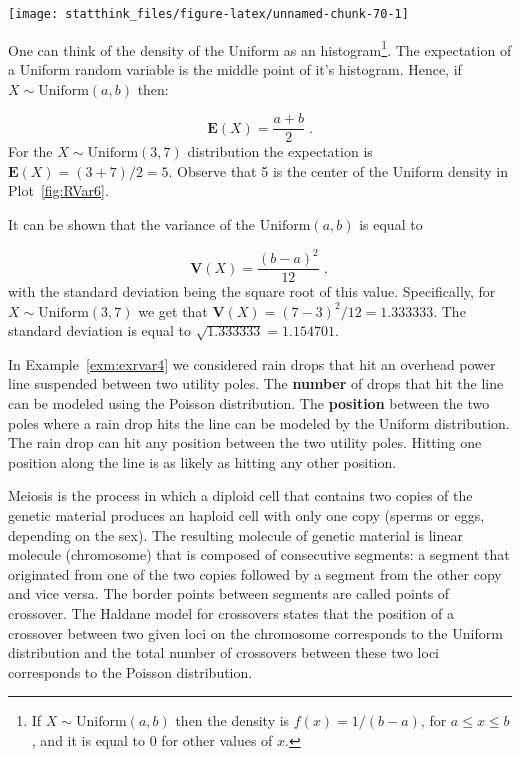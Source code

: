 \documentclass[
]{krantz}
\newcommand{\Expec}{\mathbf{E}}
\newcommand{\Var}{\mathbf{V}}
\theoremstyle{definition}
\theoremstyle{definition}
\theoremstyle{definition}
\theoremstyle{remark}
\let\BeginKnitrBlock\begin \let\EndKnitrBlock\end
\begin{document}
\begin{center}\texttt{[image: statthink\_files/figure-latex/unnamed-chunk-70-1]} \end{center}

One can think of the density of the Uniform as an histogram\footnote{If \(X \sim \mathrm{Uniform}(a,b)\) then the density is
  \(f(x) = 1/(b-a)\), for \(a \leq x \leq b\), and it is equal to 0 for
  other values of \(x\).}. The
expectation of a Uniform random variable is the middle point of it's
histogram. Hence, if \(X \sim \mathrm{Uniform}(a,b)\) then:

\[\Expec(X) = \frac{a+b}{2}\;.\] For the \(X \sim \mathrm{Uniform}(3,7)\)
distribution the expectation is \(\Expec(X)= (3+7)/2 = 5\). Observe that 5
is the center of the Uniform density in Plot~\ref{fig:RVar6}.

It can be shown that the variance of the \(\mathrm{Uniform}(a,b)\) is
equal to

\[\Var(X) = \frac{(b-a)^2}{12}\;,\] with the standard deviation
being the square root of this value. Specifically, for
\(X \sim \mathrm{Uniform}(3,7)\) we get that
\(\Var(X) = (7-3)^2/12 = 1.333333\). The standard deviation is equal to
\(\sqrt{1.333333} = 1.154701\).

\BeginKnitrBlock{example}
\protect\hypertarget{exm:exrvar5}{}{\label{exm:exrvar5} }In Example~\ref{exm:exrvar4} we considered
rain drops that hit an overhead power line suspended between two utility
poles. The {\textbf{number}} of drops that hit the line can be modeled
using the Poisson distribution. The {\textbf{position}} between the two
poles where a rain drop hits the line can be modeled by the Uniform
distribution. The rain drop can hit any position between the two utility
poles. Hitting one position along the line is as likely as hitting any
other position.
\EndKnitrBlock{example}

\BeginKnitrBlock{example}
\protect\hypertarget{exm:exrvar6}{}{\label{exm:exrvar6} }Meiosis is the process in which a diploid cell
that contains two copies of the genetic material produces an haploid
cell with only one copy (sperms or eggs, depending on the sex). The
resulting molecule of genetic material is linear molecule (chromosome)
that is composed of consecutive segments: a segment that originated from
one of the two copies followed by a segment from the other copy and vice
versa. The border points between segments are called points of
crossover. The Haldane model for crossovers states that the position of
a crossover between two given loci on the chromosome corresponds to the
Uniform distribution and the total number of crossovers between these
two loci corresponds to the Poisson distribution.
\EndKnitrBlock{example}
\end{document}
